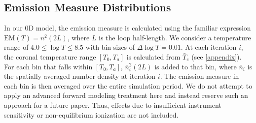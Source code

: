 \documentclass[apj]{emulateapj}
\begin{document}
	\subsection{Emission Measure Distributions}
	\label{subsec:em_dist}
	\par In our 0D model, the emission measure is calculated using the familiar expression $\mathrm{EM}(T)=n^2(2L)$, where $L$ is the loop half-length. We consider a temperature range of $4.0\le\log{T}\le8.5$ with bin sizes of $\Delta\log{T}=0.01$. At each iteration $i$, the coronal temperature range $[T_0,T_a]$ is calculated from $\bar{T}_e$ (see \autoref{appendix}). For each bin that falls within $[T_0,T_a]$, $\bar{n}_i^2(2L)$ is added to that bin, where $\bar{n}_i$ is the spatially-averaged number density at iteration $i$. The emission measure in each bin is then averaged over the entire simulation period. We do not attempt to apply an advanced forward modeling treatment here and instead reserve such an approach for a future paper. Thus, effects due to insufficient instrument sensitivity or non-equilibrium ionization are not included.
\end{document}
